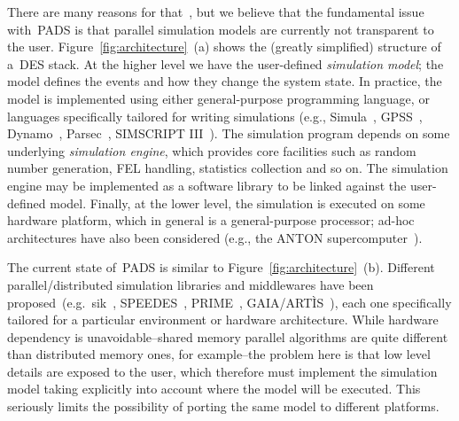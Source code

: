 \documentclass{sigplanconf}
\begin{document}
There are many reasons for that~\cite{Gda11}, but we believe that the
fundamental issue with~\ac{PADS} is that parallel simulation models
are currently not transparent to the
user. Figure~\ref{fig:architecture}~(a) shows the (greatly simplified)
structure of a~\ac{DES} stack. At the higher level we have the
user-defined \emph{simulation model}; the model defines the events and
how they change the system state. In practice, the model is
implemented using either general-purpose programming language, or
languages specifically tailored for writing simulations (e.g.,
Simula~\cite{Dahl1966}, GPSS~\cite{Gordon1978},
Dynamo~\cite{Richardson1981}, Parsec~\cite{Bagrodia1998}, SIMSCRIPT
III~\cite{Rice2005}).  The simulation program depends on some
underlying \emph{simulation engine}, which provides core facilities
such as random number generation, \ac{FEL} handling, statistics
collection and so on. The simulation engine may be implemented as a
software library to be linked against the user-defined model. Finally,
at the lower level, the simulation is executed on some hardware
platform, which in general is a general-purpose processor; ad-hoc
architectures have also been considered (e.g., the ANTON
supercomputer~\cite{Shaw08}).

The current state of~\ac{PADS} is similar to
Figure~\ref{fig:architecture}~(b). Different parallel/distributed
simulation libraries and middlewares have been
proposed~(e.g.~sik~\cite{Perumalla:2005:MPS:1069810.1070161},
SPEEDES~\cite{Steinman:2003:SPF:824475.825880}, PRIME~\cite{prime},
GAIA/ART\`IS~\cite{gda-ijspm-2009}), each one specifically tailored
for a particular environment or hardware architecture.  While hardware
dependency is unavoidable--shared memory parallel algorithms are quite
different than distributed memory ones, for example--the problem here
is that low level details are exposed to the user, which therefore
must implement the simulation model taking explicitly into account
where the model will be executed. This seriously limits the
possibility of porting the same model to different platforms.
\end{document}
